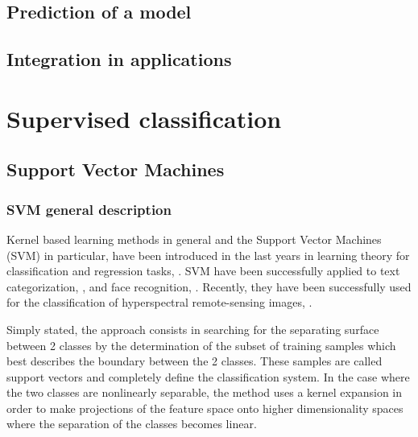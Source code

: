 


\subsection{Prediction of a model}

\ifitkFullVersion

\fi

\subsection{Integration in applications}

\section{Supervised classification}

\subsection{Support Vector Machines}
\label{sec:SupportVectorMachines}

\subsubsection{SVM general description}
Kernel based learning methods in general and the Support Vector
Machines (SVM) in particular, have been introduced in the last years
in learning theory for classification and regression tasks,
\cite{vapnik}. SVM have been successfully applied to text
categorization, \cite{joachims}, and face recognition,
\cite{osuna}. Recently, they have been successfully used for the
classification of hyperspectral remote-sensing images, \cite{bruzzoneSVM}.

Simply stated, the approach consists in searching for the separating
surface between 2 classes by the determination of the subset of
training samples which best describes the boundary between the 2
classes. These samples are called support vectors and completely
define the classification system. In the case where the two classes are
nonlinearly separable, the method uses a kernel expansion in order to make
projections of the feature space onto higher dimensionality spaces
where the separation of the classes becomes linear.


